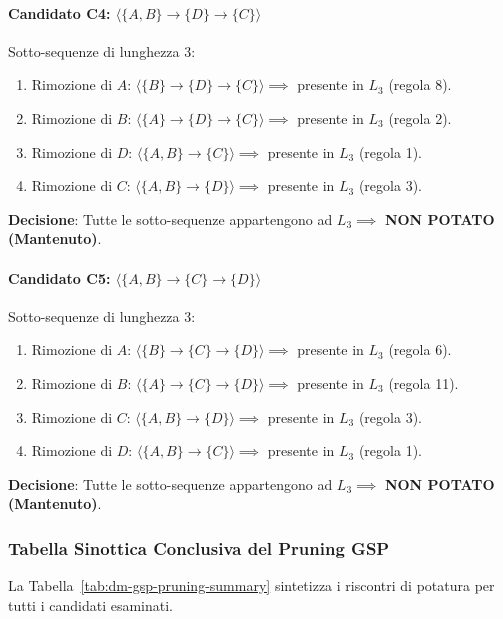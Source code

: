 \paragraph{Candidato C4: \texorpdfstring{$\langle \{A, B\} \to \{D\} \to \{C\} \rangle$}{C4}}
Sotto-sequenze di lunghezza 3:
\begin{enumerate}
    \item Rimozione di $A$: $\langle \{B\} \to \{D\} \to \{C\} \rangle \implies$ presente in $L_3$ (regola 8).
    \item Rimozione di $B$: $\langle \{A\} \to \{D\} \to \{C\} \rangle \implies$ presente in $L_3$ (regola 2).
    \item Rimozione di $D$: $\langle \{A, B\} \to \{C\} \rangle \implies$ presente in $L_3$ (regola 1).
    \item Rimozione di $C$: $\langle \{A, B\} \to \{D\} \rangle \implies$ presente in $L_3$ (regola 3).
\end{enumerate}
\textbf{Decisione}: Tutte le sotto-sequenze appartengono ad $L_3 \implies$ \textbf{NON POTATO (Mantenuto)}.

\paragraph{Candidato C5: \texorpdfstring{$\langle \{A, B\} \to \{C\} \to \{D\} \rangle$}{C5}}
Sotto-sequenze di lunghezza 3:
\begin{enumerate}
    \item Rimozione di $A$: $\langle \{B\} \to \{C\} \to \{D\} \rangle \implies$ presente in $L_3$ (regola 6).
    \item Rimozione di $B$: $\langle \{A\} \to \{C\} \to \{D\} \rangle \implies$ presente in $L_3$ (regola 11).
    \item Rimozione di $C$: $\langle \{A, B\} \to \{D\} \rangle \implies$ presente in $L_3$ (regola 3).
    \item Rimozione di $D$: $\langle \{A, B\} \to \{C\} \rangle \implies$ presente in $L_3$ (regola 1).
\end{enumerate}
\textbf{Decisione}: Tutte le sotto-sequenze appartengono ad $L_3 \implies$ \textbf{NON POTATO (Mantenuto)}.

\FloatBarrier
\subsubsection{Tabella Sinottica Conclusiva del Pruning GSP}
La Tabella~\ref{tab:dm-gsp-pruning-summary} sintetizza i riscontri di potatura per tutti i candidati esaminati.

